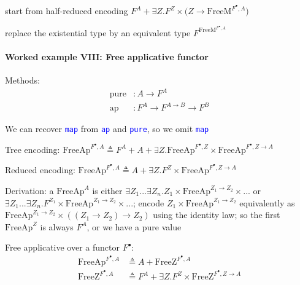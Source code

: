 start from half-reduced encoding $F^{A}+\exists Z.F^{Z}\times\big(Z\rightarrow\text{FreeM}^{F^{\bullet},A}\big)$ 

replace the existential type by an equivalent type $F^{\text{FreeM}^{F^{\bullet},A}}$


\paragraph{Worked example VIII: Free applicative functor}

Methods:
\begin{align*}
\text{pure} & :A\rightarrow F^{A}\\
\text{ap} & :F^{A}\rightarrow F^{A\rightarrow B}\rightarrow F^{B}
\end{align*}

We can recover \texttt{\textcolor{blue}{\footnotesize{}map}} from
\texttt{\textcolor{blue}{\footnotesize{}ap}} and \texttt{\textcolor{blue}{\footnotesize{}pure}},
so we omit \texttt{\textcolor{blue}{\footnotesize{}map}} 

Tree encoding: {\footnotesize{}$\text{FreeAp}^{F^{\bullet},A}\triangleq F^{A}+A+\exists Z.\text{FreeAp}^{F^{\bullet},Z}\times\text{FreeAp}^{F^{\bullet},Z\rightarrow A}$}{\footnotesize\par}

Reduced encoding:{\footnotesize{} $\text{FreeAp}^{F^{\bullet},A}\triangleq A+\exists Z.F^{Z}\times\text{FreeAp}^{F^{\bullet},Z\rightarrow A}$}{\footnotesize\par}

Derivation: a $\text{FreeAp}^{A}$ is either $\exists Z_{1}...\exists Z_{n}.Z_{1}\times\text{FreeAp}^{Z_{1}\rightarrow Z_{2}}\times...$
or $\exists Z_{1}...\exists Z_{n}.F^{Z_{1}}\times\text{FreeAp}^{Z_{1}\rightarrow Z_{2}}\times...$;
encode $Z_{1}\times\text{FreeAp}^{Z_{1}\rightarrow Z_{2}}$ equivalently
as $\text{FreeAp}^{Z_{1}\rightarrow Z_{2}}\times\left(\left(Z_{1}\rightarrow Z_{2}\right)\rightarrow Z_{2}\right)$
using the identity law; so the first $\text{FreeAp}^{Z}$ is always
$F^{A}$, or we have a pure value 

Free applicative over a functor $F^{\bullet}$: 
\begin{align*}
\text{FreeAp}^{F^{\bullet},A} & \triangleq A+\text{FreeZ}^{F^{\bullet},A}\\
\text{FreeZ}^{F^{\bullet},A} & \triangleq F^{A}+\exists Z.F^{Z}\times\text{FreeZ}^{F^{\bullet},Z\rightarrow A}
\end{align*}

